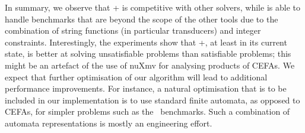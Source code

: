 
In summary, we  observe that \ostrich+ is competitive with other solvers, while is able to handle benchmarks that are beyond
the scope of the other tools due to the combination of string functions (in particular transducers) and integer
constraints. Interestingly, the experiments show that \ostrich+, at
least in its current state, is better at solving unsatisfiable problems than satisfiable problems; this might be an artefact of the
use of nuXmv for analysing products of CEFAs. We expect that further
optimisation of our algorithm will lead to additional performance improvements. 
For instance, a natural optimisation that is to be
included in our implementation is to use standard finite automata, %
as opposed to CEFAs, for simpler problems such as the
\kaluzabench\ benchmarks. Such a combination of automata
representations is mostly an engineering effort.

%




